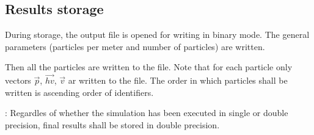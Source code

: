 \subsection{Results storage}

During storage, the output file is opened for writing in binary mode.
The general parameters (particles per meter and number of particles) are
written. 

Then all the particles are written to the file. Note that for each particle only
vectors $\vec{p}$, $\vec{hv}$, $\vec{v}$ ar written to the file. The order in
which particles shall be written is ascending order of identifiers.

: Regardles of whether the simulation has been executed in
single or double precision, final results shall be stored in double precision.
